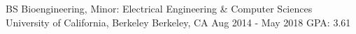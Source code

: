 \begin{cventries}
  \cventry
    {BS Bioengineering, Minor: Electrical Engineering \& Computer Sciences}
    {University of California, Berkeley}
    {Berkeley, CA}
    {Aug 2014 - May 2018}
    {GPA: 3.61}
\end{cventries}
